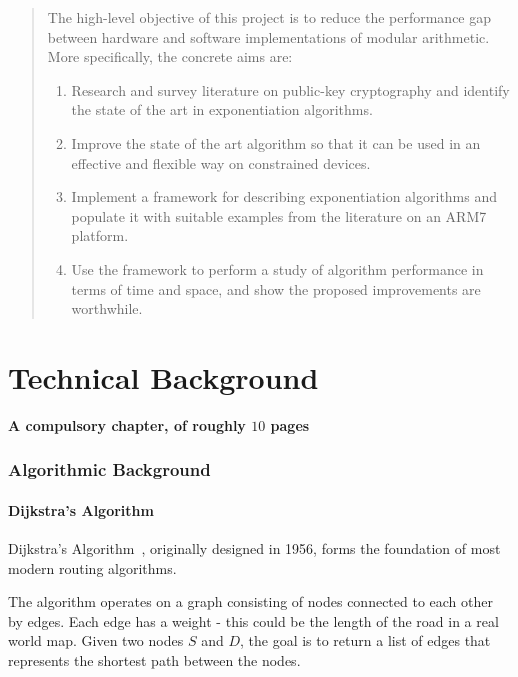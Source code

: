 \documentclass[ %
                    author={Alexander Hill},
                supervisor={Dr. Benjamin Sach},
                    degree={MEng},
                     title={MARMOSET: Multi Agent Routing for Managing Online Smart-cities for Efficient Transportation},
                  subtitle={},
                      type={research},
                      year={2016} ]{dissertation}
\begin{document}
\begin{quote}
\noindent
The high-level objective of this project is to reduce the performance
gap between hardware and software implementations of modular arithmetic.
More specifically, the concrete aims are:

\begin{enumerate}
\item Research and survey literature on public-key cryptography and
      identify the state of the art in exponentiation algorithms.
\item Improve the state of the art algorithm so that it can be used
      in an effective and flexible way on constrained devices.
\item Implement a framework for describing exponentiation algorithms
      and populate it with suitable examples from the literature on
      an ARM7 platform.
\item Use the framework to perform a study of algorithm performance
      in terms of time and space, and show the proposed improvements
      are worthwhile.
\end{enumerate}
\end{quote}


\chapter{Technical Background}
\label{chap:technical}

{\bf A compulsory chapter,     of roughly $10$ pages}
\vspace{1cm}

\subsection{Algorithmic Background}

\subsubsection{Dijkstra's Algorithm}

Dijkstra's Algorithm~\cite{dijkstra}, originally designed in 1956, forms the
foundation of most modern routing algorithms.

The algorithm operates on a graph consisting of nodes connected to each other by
edges. Each edge has a weight - this could be the length of the road in a real
world map. Given two nodes $S$ and $D$, the goal is to return a list of edges that
represents the shortest path between the nodes.
\end{document}
